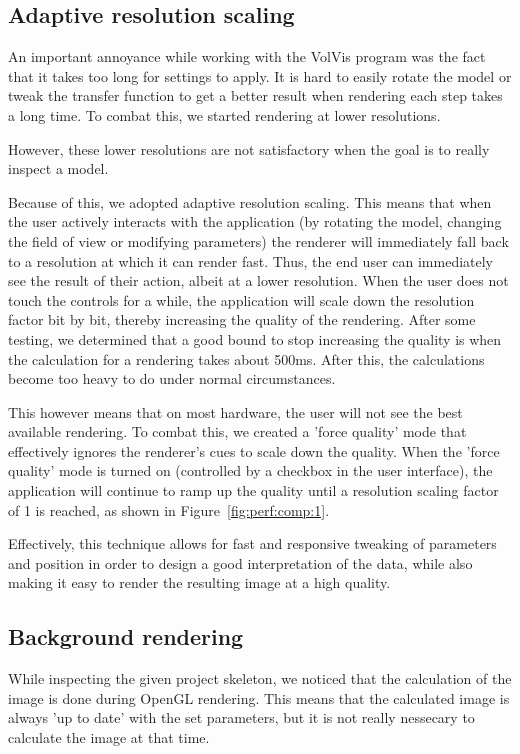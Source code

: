 \subsection{Adaptive resolution scaling}
An important annoyance while working with the VolVis program was the fact that it takes too long for settings to apply.
It is hard to easily rotate the model or tweak the transfer function to get a better result when rendering each step takes a long time.
To combat this, we started rendering at lower resolutions.

However, these lower resolutions are not satisfactory when the goal is to really inspect a model.

Because of this, we adopted adaptive resolution scaling.
This means that when the user actively interacts with the application (by rotating the model, changing the field of view or modifying parameters) the renderer will immediately fall back to a resolution at which it can render fast.
Thus, the end user can immediately see the result of their action, albeit at a lower resolution.
When the user does not touch the controls for a while, the application will scale down the resolution factor bit by bit, thereby increasing the quality of the rendering.
After some testing, we determined that a good bound to stop increasing the quality is when the calculation for a rendering takes about 500ms.
After this, the calculations become too heavy to do under normal circumstances.

This however means that on most hardware, the user will not see the best available rendering.
To combat this, we created a 'force quality' mode that effectively ignores the renderer's cues to scale down the quality.
When the 'force quality' mode is turned on (controlled by a checkbox in the user interface), the application will continue to ramp up the quality until a resolution scaling factor of 1 is reached, as shown in Figure~\ref{fig:perf:comp:1}.

Effectively, this technique allows for fast and responsive tweaking of parameters and position in order to design a good interpretation of the data, while also making it easy to render the resulting image at a high quality.

\subsection{Background rendering}
While inspecting the given project skeleton, we noticed that the calculation of the image is done during OpenGL rendering.
This means that the calculated image is always 'up to date' with the set parameters, but it is not really nessecary to calculate the image at that time.

